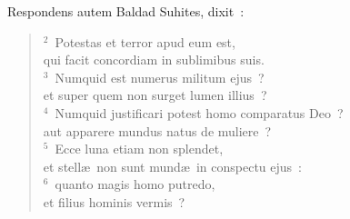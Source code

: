 \lettrine[lines=3,image=true,loversize=0.05,lraise=-0.03]{R}{}espondens autem Baldad Suhites, dixit~:
\begin{flushleft}\begin{verse}\vspace{6pt}${}^{2}$~Potestas et terror apud eum est,\\ qui facit concordiam in sublimibus suis.\\
${}^{3}$~Numquid est numerus militum ejus~?\\ et super quem non surget lumen illius~?\\
${}^{4}$~Numquid justificari potest homo comparatus Deo~?\\ aut apparere mundus natus de muliere~?\\
${}^{5}$~Ecce luna etiam non splendet,\\ et stell\ae\ non sunt mund\ae\ in conspectu ejus~:\\
${}^{6}$~quanto magis homo putredo,\\ et filius hominis vermis~?\end{verse}\end{flushleft}



